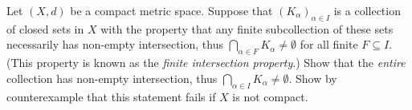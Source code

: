 \begin{exercise}\label{ex 1.5.15}
    Let \((X, d)\) be a compact metric space.
    Suppose that \((K_{\alpha})_{\alpha \in I}\) is a collection of closed sets in \(X\) with the property that any finite subcollection of these sets necessarily has non-empty intersection, thus \(\bigcap_{\alpha \in F} K_{\alpha} \neq \emptyset\) for all finite \(F \subseteq I\).
    (This property is known as the \emph{finite intersection property}.)
    Show that the \emph{entire} collection has non-empty intersection, thus \(\bigcap_{\alpha \in I} K_{\alpha} \neq \emptyset\).
    Show by counterexample that this statement fails if \(X\) is not compact.
\end{exercise}